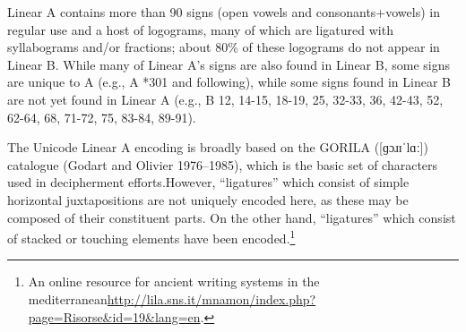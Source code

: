 Linear A contains more than 90 signs (open vowels and consonants+vowels) in regular use and a host of
logograms, many of which are ligatured with syllabograms and/or fractions; about 80\% of these
logograms do not appear in Linear B. While many of Linear A’s signs are also found in Linear B, some
signs are unique to A (e.g., A *301 and following), while some signs found in Linear B are not yet found
in Linear A (e.g., B 12, 14-15, 18-19, 25, 32-33, 36, 42-43, 52, 62-64, 68, 71-72, 75, 83-84, 89-91).

The Unicode Linear A encoding is broadly based on the GORILA ([{\arial ɡɔɹɪˈlɑː}]) catalogue
(Godart and Olivier 1976–1985)\citep{gorila}, which is the basic set of characters used in decipherment efforts.However, “ligatures” which consist of simple horizontal juxtapositions are not uniquely encoded here, as
these may be composed of their constituent parts. On the other hand, “ligatures” which consist of stacked
or touching elements have been encoded.\footnote{An online resource for ancient writing systems in the mediterranean\protect\url{http://lila.sns.it/mnamon/index.php?page=Risorse&id=19&lang=en}. } 






